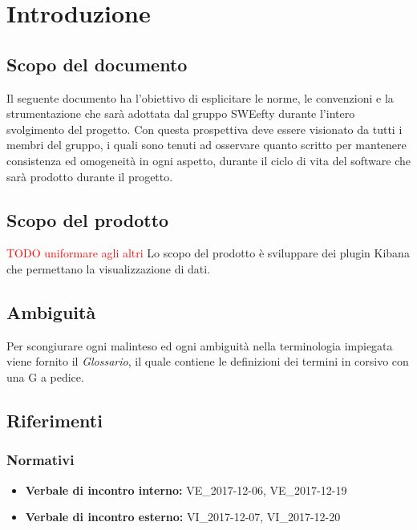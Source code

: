 \section{Introduzione}
\subsection{Scopo del documento}
Il seguente documento ha l'obiettivo di esplicitare le norme, le convenzioni e la strumentazione che sarà adottata dal gruppo SWEefty durante l'intero svolgimento del progetto. Con questa prospettiva deve essere visionato da tutti i membri del gruppo, i quali sono tenuti ad osservare quanto scritto per mantenere consistenza ed omogeneità in ogni aspetto, durante il ciclo di vita del software che sarà prodotto durante il progetto.
\subsection{Scopo del prodotto}
\textcolor{red}{TODO uniformare agli altri}
Lo scopo del prodotto è sviluppare dei plugin Kibana che permettano la visualizzazione di dati.

\subsection{Ambiguità}
Per scongiurare ogni malinteso ed ogni ambiguità nella terminologia impiegata viene fornito il \textit{Glossario}, il quale contiene le definizioni dei termini in corsivo con una G a pedice.

\subsection{Riferimenti}
	\subsubsection{Normativi}
		\begin{itemize}
			\item \textbf{Verbale di incontro interno:} VE\_2017-12-06, VE\_2017-12-19
			\item \textbf{Verbale di incontro esterno:}	VI\_2017-12-07, VI\_2017-12-20	
		\end{itemize}
